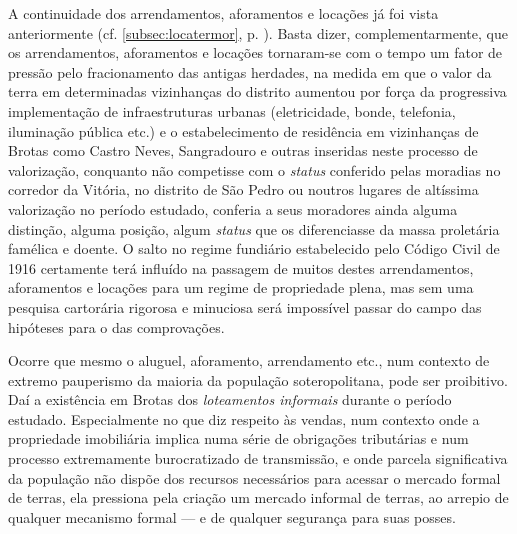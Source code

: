 A continuidade dos arrendamentos, aforamentos e locações já foi vista anteriormente (cf. \autoref{subsec:locatermor}, p. \pageref{subsec:locatermor}). Basta dizer, complementarmente, que os arrendamentos, aforamentos e locações tornaram-se com o tempo um fator de pressão pelo fracionamento das antigas herdades, na medida em que o valor da terra em determinadas vizinhanças do distrito aumentou por força da progressiva implementação de infraestruturas urbanas (eletricidade, bonde, telefonia, iluminação pública etc.) e o estabelecimento de residência em vizinhanças de Brotas como Castro Neves, Sangradouro e outras inseridas neste processo de valorização, conquanto não competisse com o \textit{status} conferido pelas moradias no corredor da Vitória, no distrito de São Pedro ou noutros lugares de altíssima valorização no período estudado, conferia a seus moradores ainda alguma distinção, alguma posição, algum \textit{status} que os diferenciasse da massa proletária famélica e doente. O salto no regime fundiário estabelecido pelo Código Civil de 1916 certamente terá influído na passagem de muitos destes arrendamentos, aforamentos e locações para um regime de propriedade plena, mas sem uma pesquisa cartorária rigorosa e minuciosa será impossível passar do campo das hipóteses para o das comprovações.

Ocorre que mesmo o aluguel, aforamento, arrendamento etc., num contexto de extremo pauperismo da maioria da população soteropolitana, pode ser proibitivo. Daí a existência em Brotas dos \textit{loteamentos informais} durante o período estudado. Especialmente no que diz respeito às vendas, num contexto onde a propriedade imobiliária implica numa série de obrigações tributárias e num processo extremamente burocratizado de transmissão, e onde parcela significativa da população não dispõe dos recursos necessários para acessar o mercado formal de terras, ela pressiona pela criação um mercado informal de terras, ao arrepio de qualquer mecanismo formal --- e de qualquer segurança para suas posses. 

